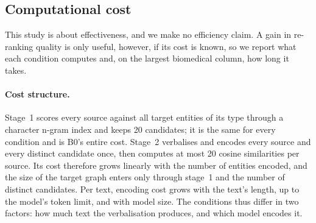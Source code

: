 

\subsection{Computational cost}
\label{sec:cost}

This study is about effectiveness, and we make no efficiency claim. A gain in
re-ranking quality is only useful, however, if its cost is known, so we report
what each condition computes and, on the largest biomedical column, how long it
takes.

\paragraph{Cost structure.}
Stage~1 scores every source against all target entities of its type through a
character n-gram index and keeps 20 candidates; it is the same for every
condition and is B0's entire cost. Stage~2 verbalises and encodes every source
and every distinct candidate once, then computes at most 20 cosine
similarities per source. Its cost therefore grows linearly with the number of
entities encoded, and the size of the target graph enters only through stage~1
and the number of distinct candidates. Per text, encoding cost grows with the
text's length, up to the model's token limit, and with model size. The
conditions thus differ in two factors: how much text the verbalisation
produces, and which model encodes it.

